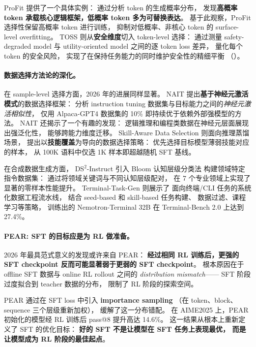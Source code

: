 ProFit \cite{liu2026profit} 提供了一个具体实例：
通过分析 token 的生成概率分布，
发现\textbf{高概率 token 承载核心逻辑框架，低概率 token 多为可替换表达}。
基于此观察，ProFit 选择性保留高概率 token 进行训练，
抑制对低概率、非核心 token 的 surface-level overfitting。
TOSS \cite{li2026toss} 则从\textbf{安全维度}切入 token-level 选择：
通过测量 safety-degraded model 与 utility-oriented model 之间的逐 token loss 差异，
量化每个 token 的安全风险，
实现了在保持任务能力的同时维护安全性的精细平衡
（）。


\paragraph{数据选择方法论的深化。}
在 sample-level 选择方面，2026 年的进展同样显著。
NAIT \cite{chen2026nait} 提出\textbf{基于神经元激活模式}的数据选择框架：
分析 instruction tuning 数据集与目标能力之间的\emph{神经元激活相似性}，
仅用 Alpaca-GPT4 数据集的 10\% 即持续优于依赖外部强模型的方法。
NAIT 还揭示了一个有趣的发现：
逻辑推理和编程类数据在神经元层面展现出强泛化性，
能够跨能力维度迁移。
Skill-Aware Data Selection \cite{zhang2026skillaware}
则面向推理蒸馏场景，
提出以\textbf{技能覆盖}为导向的数据选择策略：
优先选择目标模型薄弱技能对应的样本，
从 100K 语料中仅选 1K 样本即超越随机 SFT 基线。

在合成数据生成方面，
DS$^2$-Instruct \cite{xu2026ds2instruct} 引入 Bloom 认知层级分类法
构建领域特定指令数据集：
通过将领域关键词与不同认知层级配对，
在 7 个专业领域上实现了显著的零样本性能提升。
Terminal-Task-Gen \cite{pi2026terminaltaskgen} 则展示了
面向终端/CLI 任务的系统化数据工程流水线，
结合 seed-based 和 skill-based 任务构建、
数据过滤、课程学习等策略，
训练出的 Nemotron-Terminal 32B 在 Terminal-Bench 2.0 上达到 27.4\%。

\paragraph{PEAR: SFT 的目标应是为 RL 做准备。}
2026 年最具范式意义的发现或许来自 PEAR：
\textbf{经过相同 RL 训练后，更强的 SFT checkpoint 反而可能显著弱于更弱的 SFT checkpoint}。
根本原因在于 offline SFT 数据与 online RL rollout 之间的
\emph{distribution mismatch}——
SFT 阶段过度拟合到 teacher 数据的分布，
限制了 RL 阶段的探索空间。

PEAR 通过在 SFT loss 中引入 \textbf{importance sampling}
（在 token、block、sequence 三个层级重新加权），
缓解了这一分布错配。
在 AIME2025 上，PEAR 初始化的模型经 RL 训练后
pass@8 提升高达 14.6\%。
这一结果从根本上重新定义了 SFT 的优化目标：
\textbf{好的 SFT 不是让模型在 SFT 任务上表现最优，
而是让模型成为 RL 阶段的最佳起点}。

